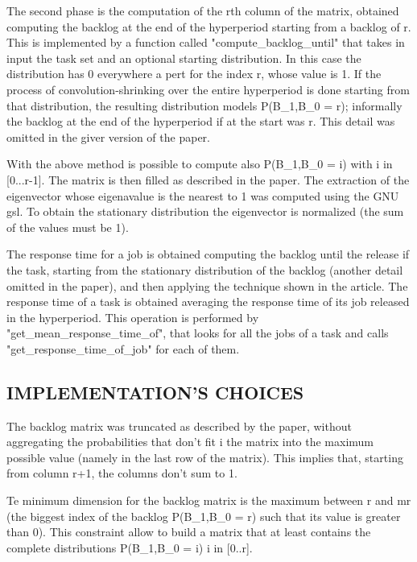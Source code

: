 \documentclass[a4paper]{article}
\begin{document}
The second phase is the computation of the rth column of the matrix, obtained computing the backlog at the end of the hyperperiod starting from a backlog of r. This is implemented by a function called "compute\_backlog\_until" that takes in input the task set and an optional starting distribution. In this case the distribution has 0 everywhere a pert for the index r, whose value is 1. If the process of convolution-shrinking over the entire hyperperiod is done starting from that distribution, the resulting distribution models P(B\_1,B\_0 = r); informally the backlog at the end of the hyperperiod if at the start was  r. This detail was omitted in the giver version of the paper.

With the above method is possible to compute also P(B\_1,B\_0 = i) with i in [0...r-1]. The matrix is then filled as described in the paper. The extraction of the eigenvector whose eigenavalue is the nearest to 1 was computed using the GNU gsl. To obtain the stationary distribution the eigenvector is normalized (the sum of the values must be 1).

The response time for a job is obtained computing the backlog until the release if the task, starting from the stationary distribution of the backlog (another detail omitted in the paper), and then applying the technique shown in the article.  The response time of a task is obtained averaging the response time of its job released in the hyperperiod. This operation is performed by "get\_mean\_response\_time\_of", that looks for all the jobs of a task and calls "get\_response\_time\_of\_job" for each of them.

\subsection{IMPLEMENTATION'S CHOICES}
The  backlog matrix was truncated as described by the paper, without aggregating the probabilities that don't fit i the matrix into the maximum possible value (namely in the last row of the matrix). This implies that, starting from column r+1, the columns don't sum to 1.

Te minimum dimension for the backlog matrix is the maximum between r and mr (the biggest index of the backlog P(B\_1,B\_0 = r) such that its value is greater than 0). This constraint allow to build a matrix that at least contains the complete distributions P(B\_1,B\_0 = i) i in [0..r]. 
\end{document}
